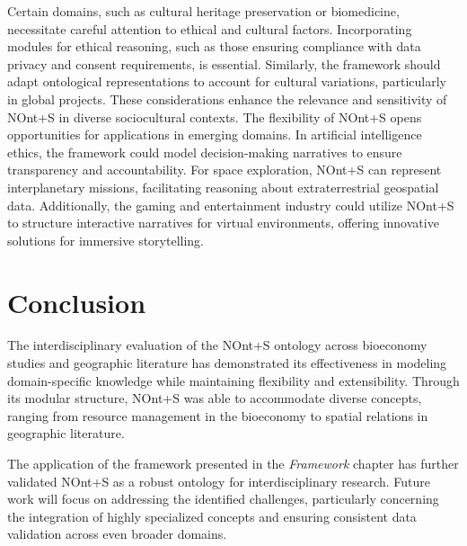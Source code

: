 Certain domains, such as cultural heritage preservation or biomedicine, necessitate careful attention to ethical and cultural factors. Incorporating modules for ethical reasoning, such as those ensuring compliance with data privacy and consent requirements, is essential. Similarly, the framework should adapt ontological representations to account for cultural variations, particularly in global projects. These considerations enhance the relevance and sensitivity of NOnt+S in diverse sociocultural contexts.
The flexibility of NOnt+S opens opportunities for applications in emerging domains. In artificial intelligence ethics, the framework could model decision-making narratives to ensure transparency and accountability. For space exploration, NOnt+S can represent interplanetary missions, facilitating reasoning about extraterrestrial geospatial data. Additionally, the gaming and entertainment industry could utilize NOnt+S to structure interactive narratives for virtual environments, offering innovative solutions for immersive storytelling.


\section{Conclusion}\label{VII-sec:conclusion}

The interdisciplinary evaluation of the NOnt+S ontology across bioeconomy studies and geographic literature has demonstrated its effectiveness in modeling domain-specific knowledge while maintaining flexibility and extensibility. Through its modular structure, NOnt+S was able to accommodate diverse concepts, ranging from resource management in the bioeconomy to spatial relations in geographic literature.

The application of the framework presented in the \textit{Framework} chapter has further validated NOnt+S as a robust ontology for interdisciplinary research. Future work will focus on addressing the identified challenges, particularly concerning the integration of highly specialized concepts and ensuring consistent data validation across even broader domains.


